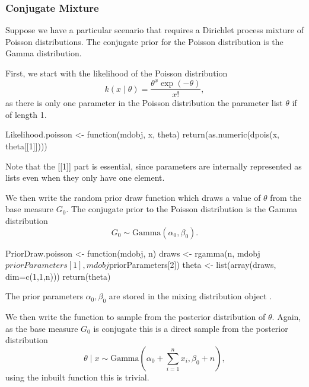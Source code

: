 \documentclass[nojss]{jss}
\begin{document}
\subsubsection{Conjugate Mixture}
Suppose we have a particular scenario that requires a Dirichlet process mixture of Poisson distributions. The conjugate prior for the Poisson distribution is the Gamma distribution.

First, we start with the likelihood of the Poisson distribution
\begin{equation*}
k(x \mid \theta) = \frac{\theta ^x \exp(-\theta)}{x!},
\end{equation*}
as there is only one parameter in the Poisson distribution the parameter list $\theta$ if of length 1.
\begin{CodeInput}
Likelihood.poisson <- function(mdobj, x, theta){
  return(as.numeric(dpois(x, theta[[1]])))
}
\end{CodeInput}
Note that the [[1]] part is essential, since parameters are internally represented as lists even when they only have one element.

We then write the random prior draw function which draws a value of $\theta$ from the base measure $G_0$. The conjugate prior to the Poisson distribution is the Gamma distribution
\begin{equation*}
G_0 \sim \text{Gamma} (\alpha _0, \beta _0).
\end{equation*}
\begin{CodeInput}
PriorDraw.poisson <- function(mdobj, n){
  draws <- rgamma(n, mdobj$priorParameters[1], mdobj$priorParameters[2])
  theta <- list(array(draws, dim=c(1,1,n)))
  return(theta)
 }
\end{CodeInput}
The prior parameters $\alpha_0, \beta_0$ are stored in the mixing distribution object .

We then write the  function to sample from the posterior distribution of $\theta$. Again, as the base measure $G_0$ is conjugate this is a direct sample from the posterior distribution
\begin{equation*}
\theta \mid x \sim \text{Gamma} (\alpha _0 + \sum_{i=1} ^n x_i, \beta_0 + n),
\end{equation*}
using the inbuilt  function this is trivial.
\end{document}
